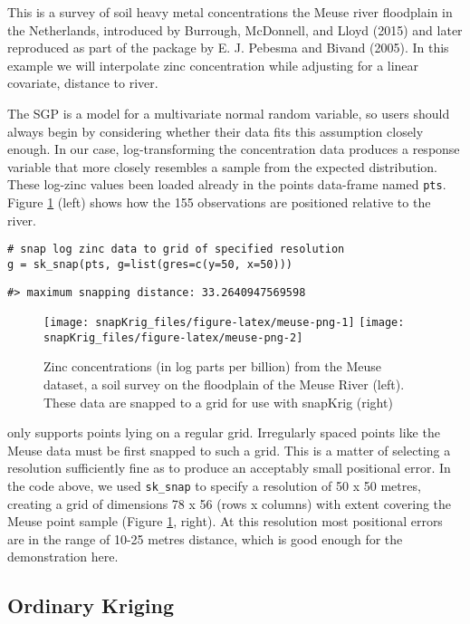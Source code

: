 This is a survey of soil heavy metal concentrations the Meuse river floodplain in the Netherlands, introduced by Burrough, McDonnell, and Lloyd (2015) and later reproduced as part of the  package by E. J. Pebesma and Bivand (2005). In this example we will interpolate zinc concentration while adjusting for a linear covariate, distance to river.

The SGP is a model for a multivariate normal random variable, so users should always begin by considering whether their data fits this assumption closely enough. In our case, log-transforming the concentration data produces a response variable that more closely resembles a sample from the expected distribution. These log-zinc values been loaded already in the  points data-frame named \texttt{pts}. Figure \ref{fig:meuse-png} (left) shows how the 155 observations are positioned relative to the river.

\begin{verbatim}
# snap log zinc data to grid of specified resolution
g = sk_snap(pts, g=list(gres=c(y=50, x=50)))
\end{verbatim}

\begin{verbatim}
#> maximum snapping distance: 33.2640947569598
\end{verbatim}

\begin{figure}
\texttt{[image: snapKrig\_files/figure-latex/meuse-png-1]} \texttt{[image: snapKrig\_files/figure-latex/meuse-png-2]} \caption{Zinc concentrations (in log parts per billion) from the Meuse dataset, a soil survey on the floodplain of the Meuse River (left). These data are snapped to a grid for use with snapKrig (right)}\label{fig:meuse-png}
\end{figure}

 only supports points lying on a regular grid. Irregularly spaced points like the Meuse data must be first snapped to such a grid. This is a matter of selecting a resolution sufficiently fine as to produce an acceptably small positional error. In the code above, we used \texttt{sk\_snap} to specify a resolution of 50 x 50 metres, creating a grid of dimensions 78 x 56 (rows x columns) with extent covering the Meuse point sample (Figure \ref{fig:meuse-png}, right). At this resolution most positional errors are in the range of 10-25 metres distance, which is good enough for the demonstration here.

\hypertarget{ordinary-kriging}{%
\subsection{Ordinary Kriging}\label{ordinary-kriging}}

